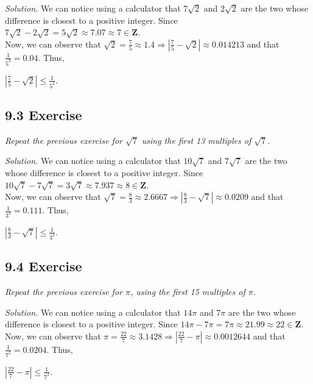 \documentclass{article}
\begin{document}
\textit{Solution.} We can notice using a calculator that $7\sqrt{2}$ and $2\sqrt{2}$ are the two whose difference is closest to a positive integer. Since $7\sqrt{2} - 2\sqrt{2} = 5\sqrt{2} \approx 7.07 \approx 7 \in \mathbf{Z}$.\\
Now, we can observe that $\sqrt{2} = \frac{7}{5} \approx 1.4 \Longrightarrow |\frac{7}{5} - \sqrt{2}| \approx 0.014213$ and that $\frac{1}{5^2} = 0.04$. Thus,
\begin{center}
    $|\frac{7}{5} - \sqrt{2}| \leq \frac{1}{5^{2}}$.
\end{center}

\subsection*{9.3 Exercise} 
\quad \textit{Repeat the previous exercise for $\sqrt{7}$ using the first 13 multiples of $\sqrt{7}$.}

\textit{Solution.} We can notice using a calculator that $10\sqrt{7}$ and $7\sqrt{7}$ are the two whose difference is closest to a positive integer. Since $10\sqrt{7} - 7\sqrt{7} = 3\sqrt{7} \approx 7.937 \approx 8 \in \mathbf{Z}$.\\
Now, we can observe that $\sqrt{7} = \frac{8}{3} \approx 2.6667 \Longrightarrow |\frac{8}{3} - \sqrt{7}| \approx 0.0209$ and that $\frac{1}{3^2} = 0.111$. Thus,
\begin{center}
    $|\frac{8}{3} - \sqrt{7}| \leq \frac{1}{3^{2}}$.
\end{center}

\subsection*{9.4 Exercise} 
\quad \textit{Repeat the previous exercise for $\pi$, using the first 15 multiples of $\pi$.}

\textit{Solution.} We can notice using a calculator that $14\pi$ and $7\pi$ are the two whose difference is closest to a positive integer. Since $14\pi - 7\pi = 7\pi \approx 21.99 \approx 22 \in \mathbf{Z}$.\\
Now, we can observe that $\pi = \frac{22}{7} \approx 3.1428 \Longrightarrow |\frac{22}{7} - \pi| \approx 0.0012644$ and that $\frac{1}{7^2} = 0.0204$. Thus,
\begin{center}
    $|\frac{22}{7} - \pi| \leq \frac{1}{7^{2}}$.
\end{center}
\end{document}
